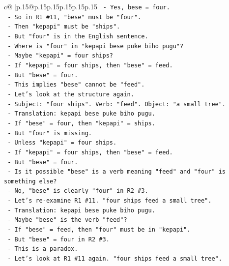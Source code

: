 \documentclass{article}
\begin{document}
{\begin{supertabular}{c@{$\;$}|p{.15\linewidth}@{}p{.15\linewidth}p{.15\linewidth}p{.15\linewidth}p{.15\linewidth}p{.15\linewidth}}
{{{\texttt{        {-} Yes, bese = four.} \\
\texttt{        {-} So in R1 \#11, "bese" must be "four".} \\
\texttt{        {-} Then "kepapi" must be "ships".} \\
\texttt{        {-} But "four" is in the English sentence.} \\
\texttt{        {-} Where is "four" in "kepapi bese puke biho pugu"?} \\
\texttt{        {-} Maybe "kepapi" = four ships?} \\
\texttt{        {-} If "kepapi" = four ships, then "bese" = feed.} \\
\texttt{        {-} But "bese" = four.} \\
\texttt{        {-} This implies "bese" cannot be "feed".} \\
\texttt{        {-} Let's look at the structure again.} \\
\texttt{        {-} Subject: "four ships". Verb: "feed". Object: "a small tree".} \\
\texttt{        {-} Translation: kepapi bese puke biho pugu.} \\
\texttt{        {-} If "bese" = four, then "kepapi" = ships.} \\
\texttt{        {-} But "four" is missing.} \\
\texttt{        {-} Unless "kepapi" = four ships.} \\
\texttt{        {-} If "kepapi" = four ships, then "bese" = feed.} \\
\texttt{        {-} But "bese" = four.} \\
\texttt{        {-} Is it possible "bese" is a verb meaning "feed" and "four" is something else?} \\
\texttt{        {-} No, "bese" is clearly "four" in R2 \#3.} \\
\texttt{        {-} Let's re{-}examine R1 \#11. "four ships feed a small tree".} \\
\texttt{        {-} Translation: kepapi bese puke biho pugu.} \\
\texttt{        {-} Maybe "bese" is the verb "feed"?} \\
\texttt{        {-} If "bese" = feed, then "four" must be in "kepapi".} \\
\texttt{        {-} But "bese" = four in R2 \#3.} \\
\texttt{        {-} This is a paradox.} \\
\texttt{        {-} Let's look at R1 \#11 again. "four ships feed a small tree".} \\
}}}
\end{supertabular}}
\end{document}

